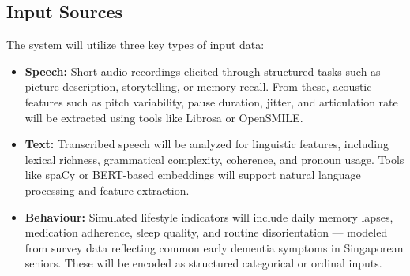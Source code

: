 \documentclass[12pt]{article}
\begin{document}
\subsection*{Input Sources}
The system will utilize three key types of input data:

\begin{itemize}
    \item \textbf{Speech:} Short audio recordings elicited through structured tasks such as picture description, storytelling, or memory recall. From these, acoustic features such as pitch variability, pause duration, jitter, and articulation rate will be extracted using tools like Librosa or OpenSMILE.
    
    \item \textbf{Text:} Transcribed speech will be analyzed for linguistic features, including lexical richness, grammatical complexity, coherence, and pronoun usage. Tools like spaCy or BERT-based embeddings will support natural language processing and feature extraction.
    
    \item \textbf{Behaviour:} Simulated lifestyle indicators will include daily memory lapses, medication adherence, sleep quality, and routine disorientation — modeled from survey data reflecting common early dementia symptoms in Singaporean seniors. These will be encoded as structured categorical or ordinal inputs.
\end{itemize}
\end{document}
